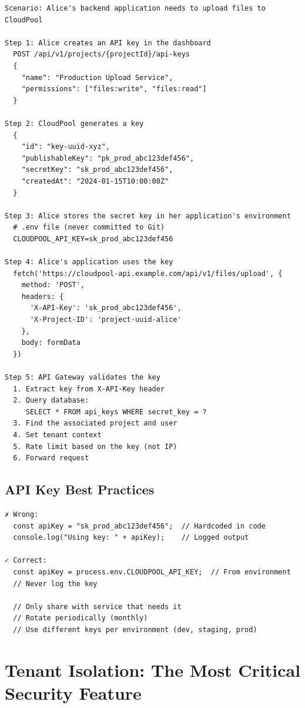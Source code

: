 \documentclass[11pt,a4paper]{report}
\begin{document}
\begin{lstlisting}[language=text]
Scenario: Alice's backend application needs to upload files to CloudPool

Step 1: Alice creates an API key in the dashboard
  POST /api/v1/projects/{projectId}/api-keys
  {
    "name": "Production Upload Service",
    "permissions": ["files:write", "files:read"]
  }

Step 2: CloudPool generates a key
  {
    "id": "key-uuid-xyz",
    "publishableKey": "pk_prod_abc123def456",
    "secretKey": "sk_prod_abc123def456",
    "createdAt": "2024-01-15T10:00:00Z"
  }

Step 3: Alice stores the secret key in her application's environment
  # .env file (never committed to Git)
  CLOUDPOOL_API_KEY=sk_prod_abc123def456

Step 4: Alice's application uses the key
  fetch('https://cloudpool-api.example.com/api/v1/files/upload', {
    method: 'POST',
    headers: {
      'X-API-Key': 'sk_prod_abc123def456',
      'X-Project-ID': 'project-uuid-alice'
    },
    body: formData
  })

Step 5: API Gateway validates the key
  1. Extract key from X-API-Key header
  2. Query database: 
     SELECT * FROM api_keys WHERE secret_key = ?
  3. Find the associated project and user
  4. Set tenant context
  5. Rate limit based on the key (not IP)
  6. Forward request
\end{lstlisting}


\section{API Key Best Practices}


\begin{lstlisting}[language=text]
✗ Wrong:
  const apiKey = "sk_prod_abc123def456";  // Hardcoded in code
  console.log("Using key: " + apiKey);    // Logged output

✓ Correct:
  const apiKey = process.env.CLOUDPOOL_API_KEY;  // From environment
  // Never log the key
  
  // Only share with service that needs it
  // Rotate periodically (monthly)
  // Use different keys per environment (dev, staging, prod)
\end{lstlisting}


\chapter{Tenant Isolation: The Most Critical Security Feature}
\end{document}
